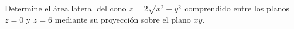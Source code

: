 Determine el área lateral del cono $z=2\sqrt{x^2+y^2}$ comprendido entre los planos $z=0$ y $z=6$ mediante su proyección sobre el plano $xy$.

